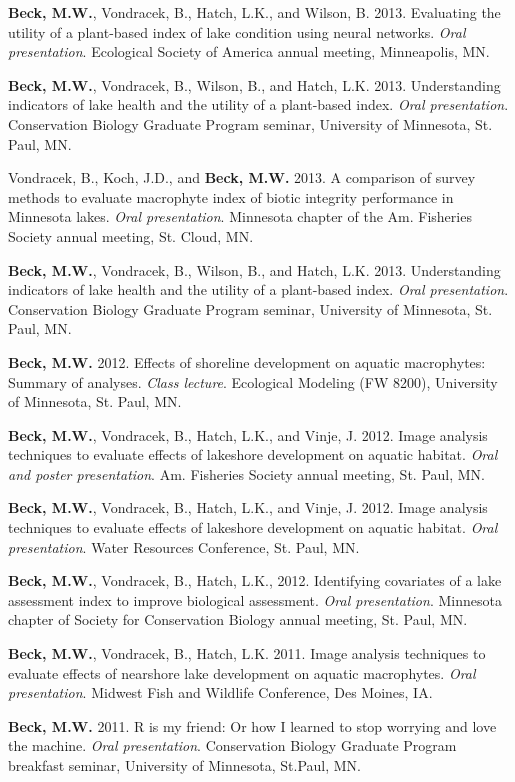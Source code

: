 \documentclass[letterpaper,12pt]{article}
\begin{document}
{\bf Beck, M.W.}, Vondracek, B., Hatch, L.K., and Wilson, B. 2013. Evaluating the utility of a plant-based index of lake condition using neural networks. \textit{Oral presentation}. Ecological Society of America annual meeting, Minneapolis, MN.

{\bf Beck, M.W.}, Vondracek, B., Wilson, B., and Hatch, L.K. 2013. Understanding indicators of lake health and the utility of a plant-based index. \textit{Oral presentation}. Conservation Biology Graduate Program seminar, University of Minnesota, St. Paul, MN.

Vondracek, B., Koch, J.D., and {\bf Beck, M.W.} 2013. A comparison of survey methods to evaluate macrophyte index of biotic integrity performance in Minnesota lakes. \textit{Oral presentation}. Minnesota chapter of the Am. Fisheries Society annual meeting, St. Cloud, MN.

{\bf Beck, M.W.}, Vondracek, B., Wilson, B., and Hatch, L.K. 2013. Understanding indicators of lake health and the utility of a plant-based index. \textit{Oral presentation}. Conservation Biology Graduate Program seminar, University of Minnesota, St. Paul, MN.

{\bf Beck, M.W.} 2012. Effects of shoreline development on aquatic macrophytes: Summary of analyses. \textit{Class lecture}. Ecological Modeling (FW 8200), University of Minnesota, St. Paul, MN.

{\bf Beck, M.W.}, Vondracek, B., Hatch, L.K., and Vinje, J. 2012. Image analysis techniques to evaluate effects of lakeshore development on aquatic habitat. \textit{Oral and poster presentation}. Am. Fisheries Society annual meeting, St. Paul, MN.

{\bf Beck, M.W.}, Vondracek, B., Hatch, L.K., and Vinje, J. 2012. Image analysis techniques to evaluate effects of lakeshore development on aquatic habitat. \textit{Oral presentation}. Water Resources Conference, St. Paul, MN.

{\bf Beck, M.W.}, Vondracek, B., Hatch, L.K., 2012. Identifying covariates of a lake assessment index to improve biological assessment. \textit{Oral presentation}. Minnesota chapter of Society for Conservation Biology annual meeting, St. Paul, MN.

{\bf Beck, M.W.}, Vondracek, B., Hatch, L.K. 2011. Image analysis techniques to evaluate effects of nearshore lake development on aquatic macrophytes. \textit{Oral presentation}. Midwest Fish and Wildlife Conference, Des Moines, IA.

{\bf Beck, M.W.} 2011. R is my friend: Or how I learned to stop worrying and love the machine. \textit{Oral presentation}. Conservation Biology Graduate Program breakfast seminar, University of Minnesota, St.Paul, MN.
\end{document}
